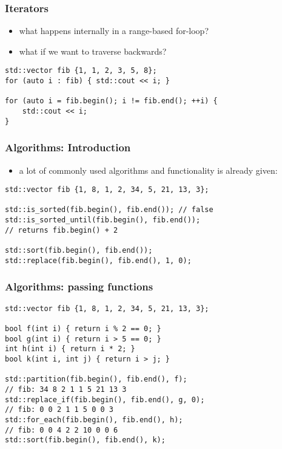 \begin{frame}[fragile]
    \frametitle{Iterators}
    \begin{itemize}
        \item what happens internally in a range-based for-loop?
        \item what if we want to traverse backwards?
    \end{itemize}
    \begin{lstlisting}[numbers=none]
std::vector fib {1, 1, 2, 3, 5, 8};
for (auto i : fib) { std::cout << i; }

for (auto i = fib.begin(); i != fib.end(); ++i) {
    std::cout << i;
}
    \end{lstlisting}
\end{frame}

\begin{frame}[fragile]
    \frametitle{Algorithms: Introduction}
    \begin{itemize}
        \item a lot of commonly used algorithms and functionality is already given:
    \end{itemize}
    \begin{lstlisting}[numbers=none]
std::vector fib {1, 8, 1, 2, 34, 5, 21, 13, 3};

std::is_sorted(fib.begin(), fib.end()); // false
std::is_sorted_until(fib.begin(), fib.end());
// returns fib.begin() + 2

std::sort(fib.begin(), fib.end());
std::replace(fib.begin(), fib.end(), 1, 0);
    \end{lstlisting}
\end{frame}

\begin{frame}[fragile]
    \frametitle{Algorithms: passing functions}
    \begin{lstlisting}[numbers=none]
std::vector fib {1, 8, 1, 2, 34, 5, 21, 13, 3};

bool f(int i) { return i % 2 == 0; }
bool g(int i) { return i > 5 == 0; }
int h(int i) { return i * 2; }
bool k(int i, int j) { return i > j; }

std::partition(fib.begin(), fib.end(), f);
// fib: 34 8 2 1 1 5 21 13 3
std::replace_if(fib.begin(), fib.end(), g, 0);
// fib: 0 0 2 1 1 5 0 0 3
std::for_each(fib.begin(), fib.end(), h);
// fib: 0 0 4 2 2 10 0 0 6
std::sort(fib.begin(), fib.end(), k);
    \end{lstlisting}
\end{frame}

